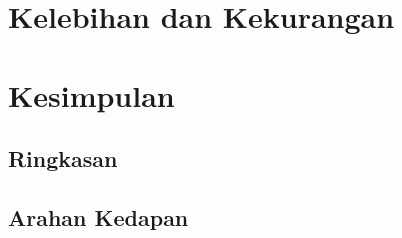 \section{Kelebihan dan Kekurangan}
\lipsum

\section{Kesimpulan}

	\subsection{Ringkasan}
	\lipsum[1]

	\subsection{Arahan Kedapan}
	\lipsum[1]